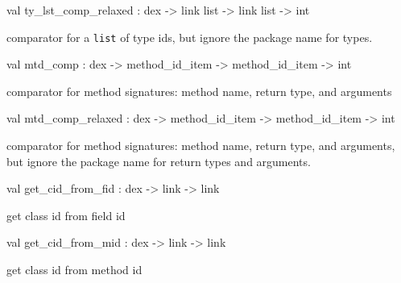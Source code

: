 \documentclass[11pt]{article}
\begin{document}
\label{val:Dex.ty-underscorelst-underscorecomp-underscorerelaxed}\begin{ocamldoccode}
val ty_lst_comp_relaxed : dex -> link list -> link list -> int
\end{ocamldoccode}
\begin{ocamldocdescription}
comparator for a {\tt{list}} of type ids,
  but ignore the package name for types.


\end{ocamldocdescription}




\label{val:Dex.mtd-underscorecomp}\begin{ocamldoccode}
val mtd_comp : dex -> method_id_item -> method_id_item -> int
\end{ocamldoccode}
\begin{ocamldocdescription}
comparator for method signatures: method name, return type, and arguments


\end{ocamldocdescription}




\label{val:Dex.mtd-underscorecomp-underscorerelaxed}\begin{ocamldoccode}
val mtd_comp_relaxed : dex -> method_id_item -> method_id_item -> int
\end{ocamldoccode}
\begin{ocamldocdescription}
comparator for method signatures: method name, return type, and arguments,
  but ignore the package name for return types and arguments.


\end{ocamldocdescription}




\label{val:Dex.get-underscorecid-underscorefrom-underscorefid}\begin{ocamldoccode}
val get_cid_from_fid : dex -> link -> link
\end{ocamldoccode}
\begin{ocamldocdescription}
get class id from field id


\end{ocamldocdescription}




\label{val:Dex.get-underscorecid-underscorefrom-underscoremid}\begin{ocamldoccode}
val get_cid_from_mid : dex -> link -> link
\end{ocamldoccode}
\begin{ocamldocdescription}
get class id from method id


\end{ocamldocdescription}
\end{document}
